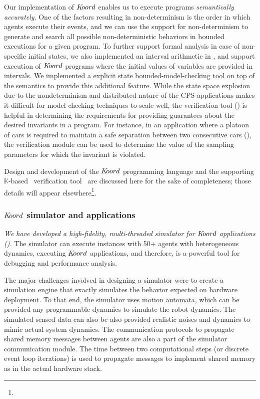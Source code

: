 Our \K implementation of $K\kern-2pt oord$ enables us to execute  programs \emph{semantically accurately}. One of the factors resulting in non-determinism is the order in which agents execute their events, and we can use the \K support for non-determinism to generate and search all possible non-deterministic behaviors in bounded executions for a given program. To further support formal analysis in case of non-specific initial states, we also implemented an interval arithmetic in \K, and support execution of $K\kern-2pt oord$ programs where the initial values of variables are provided in intervals. We implemented a explicit state bounded-model-checking  tool on top of the \K semantics to provide this additional feature. While the state space explosion due to the nondeterminism and distributed nature of the CPS applications makes it difficult for model checking techniques to scale well, the verification tool (\kbmc) is helpful in determining the requirements for providing guarantees about the desired invariants in a program. For instance, in an application where a platoon of cars is required to maintain a safe separation between two consecutive cars (), the verification module can be used to determine the value of the sampling parameters for which the invariant is violated.

Design and development of the $K\kern-2pt oord$ programming language and the supporting $\mathbb{K}$-based~\cite{Kpaper} verification tool \kbmc\, are discussed here for the sake of completeness; those details will appear elsewhere\footnote{}.

\subsubsection{$K\kern-2pt oord$ simulator and applications}

{\em We have developed a high-fidelity, multi-threaded simulator for $K\kern-2pt oord$ applications (). } The simulator can execute instances with 50+ agents with heterogeneous dynamics, executing $K\kern-2pt oord$ applications, and therefore, is a powerful tool for debugging and performance analysis.  

The major challenges involved in designing a simulator were to create a simulation engine that exactly simulates the behavior expected on hardware deployment. 
To that end, the simulator uses motion automata, which can be provided any programmable dynamics to simulate the robot dynamics. The simulated sensed data can also be also provided realistic noises and dynamics to mimic actual system dynamics. The communication protocols to propagate shared memory messages between agents are also a part of the simulator communication module. The time between two computational steps (or discrete event loop iterations) is used to propagate messages to implement shared memory as in the actual hardware stack.

